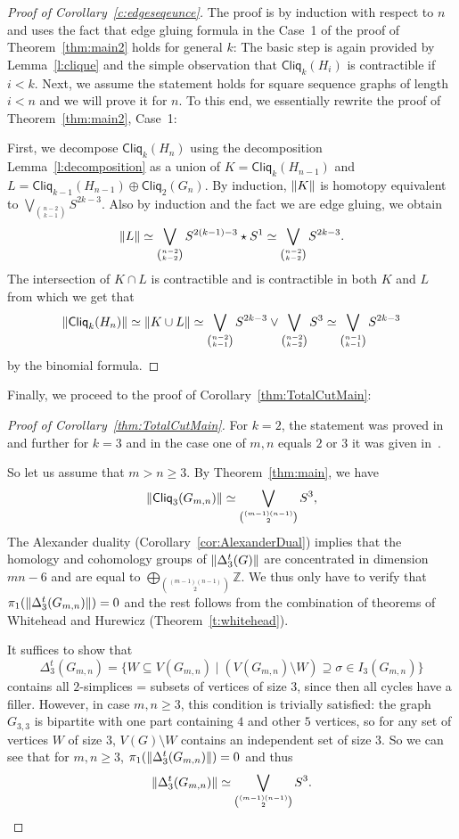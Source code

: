 \documentclass[a4paper, v2021]{lipics-v2021}
\theoremstyle{plain}
\theoremstyle{definition}
\newcommand{\Cliq}[2]{\mathsf{Cliq}_{#1}(#2)}
\DeclarePairedDelimiter{\gr}{\lVert}{\rVert}
\begin{document}
\begin{proof}[Proof of Corollary~\ref{c:edgeseqeunce}]
The proof is by induction with respect to $n$ and uses the fact that edge gluing formula in the Case~1 of the proof of Theorem~\ref{thm:main2} holds for general $k$:
The basic step is again provided by Lemma~\ref{l:clique} and the simple observation that $\Cliq{k}{H_i}$ is contractible if $i<k$.
Next, we assume the statement holds for square sequence graphs of length $i<n$ and we will prove it for $n$. To this end, we essentially rewrite the proof of Theorem~\ref{thm:main2}, Case~1:

First, we decompose $\Cliq{k}{H_n}$ using the decomposition Lemma~\ref{l:decomposition} as a union of $K = \Cliq{k}{H_{n-1}}$ and $L = \Cliq{k-1}{H_{n-1}} \oplus \Cliq{2}{G_{n}}$.
By induction, $\gr{K}$ is homotopy equivalent to $\bigvee_{\binom{n-2}{k-1}} S^{2k-3}$. Also by induction and the fact we are edge gluing, we obtain
\[
\gr{L} \simeq \bigvee_{\binom{n-2}{k-2}} S^{2{(k-1)} - 3} \star S^1 \simeq \bigvee_{\binom{n-2}{k-2}} S^{2k - 3}.
\]
The intersection of $K\cap L$ is contractible and is contractible in both $K$ and $L$ from which we get that 
\[
\gr{\Cliq{k}{H_n}} \simeq \gr{K\cup L} \simeq \bigvee_{\binom{n-2}{k-1}} S^{2k-3} \vee \bigvee_{\binom{n-2}{k-2}} S^{3} \simeq \bigvee_{\binom{n-1}{k-1}} S^{2k-3}
\]
by the binomial formula.
\end{proof}
Finally, we proceed to the proof of Corollary~\ref{thm:TotalCutMain}:
\begin{proof}[Proof of Corollary~\ref{thm:TotalCutMain}]
For $k = 2$, the statement was proved in~\cite[Theorem~4.16]{BayerDJRSX24} and further for $k=3$ and in the case one of $m,n$ equals $2$ or $3$ it was given in~\cite[Theorem~1.1]{ChandrakarHRS24}.

So let us assume that $m>n \geq 3$. By
Theorem~\ref{thm:main}, we have
\[
 \gr{\Cliq{3}{G_{m,n}}} \simeq \bigvee_{
    \binom{(m-1)(n-1)}{2}} S^{3},
\]
The Alexander duality (Corollary~\ref{cor:AlexanderDual}) implies that the homology and cohomology groups of $\gr{\Delta_3^t (G)}$ are concentrated in dimension $mn - 6$ and are equal to $\bigoplus_{\binom{(m-1)(n-1)}{2}} \mathbb{Z}$. We thus only have to verify that $\pi_1(\gr{\Delta_3^t (G_{m,n})}) = 0$ and the rest follows from the combination of theorems of Whitehead and Hurewicz (Theorem~\ref{t:whitehead}).

It suffices to show that 
\[
\Delta_3^t (G_{m,n}) = \{ W\subseteq V(G_{m,n}) \mid (V(G_{m,n})\setminus W) \supseteq \sigma \in I_3(G_{m,n}) \}
\]
contains all $2$-simplices = subsets of vertices of size $3$, since then all cycles have a filler. However, in case $m,n \geq 3$, this condition is trivially satisfied: the graph $G_{3,3}$ is bipartite with one part containing $4$ and other $5$ vertices, so for any set of vertices $W$ of size $3$, $V(G)\setminus W$ contains an independent set of size $3$. So we can see that for $m,n\geq 3$, $\pi_1(\gr{\Delta_3^t (G_{m,n})}) = 0$ and thus 
\[
 \gr{\Delta_3^t (G_{m,n})} \simeq \bigvee_{
    \binom{(m-1)(n-1)}{2}} S^{3}.
\]
\end{proof}
\end{document}

